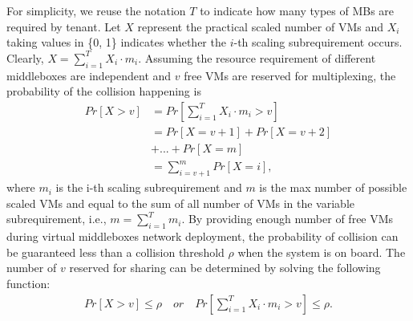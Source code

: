 \documentclass[review]{elsarticle}
\begin{document}
For simplicity, we reuse the notation $T$ to indicate how many types of MBs are required by tenant. Let $X$ represent the practical scaled  number of VMs and $X_{i}$ taking values in \{0, 1\} indicates whether the $i$-th scaling subrequirement occurs. Clearly, $X=\sum_{i=1}^{T}X_{i}\cdot m_{i}$. Assuming the resource requirement of different middleboxes are independent and $v$ free VMs are reserved for multiplexing, the probability of the collision happening is
\begin{equation} 
\begin{aligned}
Pr\left[X>v\right]
& = Pr\left[\sum_{i=1}^{T}X_{i}\cdot m_{i}>v\right]\\
& = Pr\left[X=v+1 \right] + Pr\left[X=v+2 \right]\\
& + ...+ Pr\left[X=m \right] \\
& = \sum_{i=v+1}^{m}Pr\left[X=i \right],
\end{aligned}
\end{equation}
where $m_i$ is the i-th scaling subrequirement and $m$ is the max number of possible scaled VMs and equal to the sum of all number of VMs in the variable subrequirement, i.e., $m=\sum_{i=1}^{T} m_i$. 
By providing enough number of free VMs during virtual middleboxes network deployment, the probability of collision can be guaranteed less than a collision threshold $\rho$ when the system is on board. The number of $v$ reserved for sharing can be determined by solving the following function:
\begin{equation}\label{equ:collision}  
\begin{aligned} 
Pr\left[ X>v \right] \leq \rho \quad or	\quad Pr\left[ \sum_{i=1}^{T} X_{i}\cdot m_{i} > v \right] \leq \rho.
\end{aligned}
\end{equation}
\end{document}
